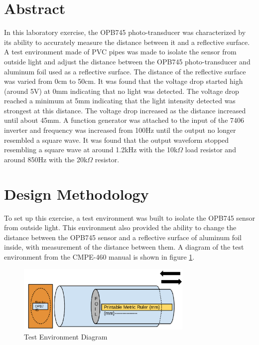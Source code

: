 \documentclass[CMPE]{KGCOEReport}
\begin{document}
\maketitle

\section*{Abstract}

In this laboratory exercise, the OPB745 photo-transducer was characterized by its ability to accurately measure the distance between it and a reflective surface. A test environment made of PVC pipes was made to isolate the sensor from outside light and adjust the distance between the OPB745 photo-transducer and aluminum foil used as a reflective surface. The distance of the reflective surface was varied from 0cm to 50cm. It was found that the voltage drop started high (around 5V) at 0mm indicating that no light was detected. The voltage drop reached a minimum at 5mm indicating that the light intensity detected was strongest at this distance. The voltage drop increased as the distance increased until about 45mm. A function generator was attached to the input of the 7406 inverter and frequency was increased from 100Hz until the output no longer resembled a square wave. It was found that the output waveform stopped resembling a square wave at around 1.2kHz with the 10k$\Omega$ load resistor and around 850Hz with the 20k$\Omega$ resistor.

\section*{Design Methodology}

To set up this exercise, a test environment was built to isolate the OPB745 sensor from outside light. This environment also provided the ability to change the distance between the OPB745 sensor and a reflective surface of aluminum foil inside, with measurement of the distance between them. A diagram of the test environment from the CMPE-460 manual is shown in figure \ref{fig:env}.

\begin{figure}[H]
    \centering
    \includegraphics[width=0.75\textwidth]{test_env.png}
    \caption{Test Environment Diagram}
    \label{fig:env}
\end{figure}
\end{document}
